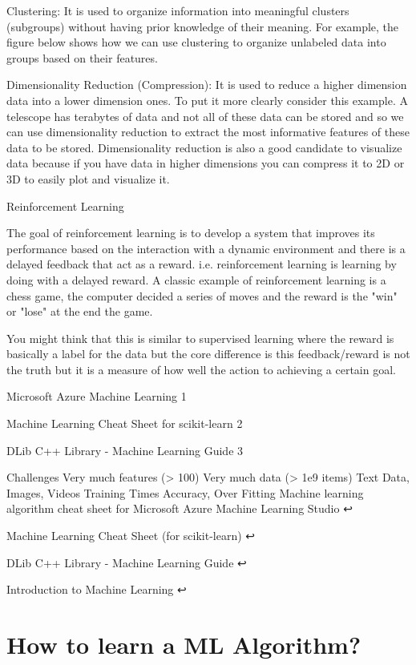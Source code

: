 Clustering: It is used to organize information into meaningful clusters (subgroups) without having prior knowledge of their meaning. For example, the figure below shows how we can use clustering to organize unlabeled data into groups based on their features.


Dimensionality Reduction (Compression): It is used to reduce a higher dimension data into a lower dimension ones. To put it more clearly consider this example. A telescope has terabytes of data and not all of these data can be stored and so we can use dimensionality reduction to extract the most informative features of these data to be stored. Dimensionality reduction is also a good candidate to visualize data because if you have data in higher dimensions you can compress it to 2D or 3D to easily plot and visualize it.

Reinforcement Learning

The goal of reinforcement learning is to develop a system that improves its performance based on the interaction with a dynamic environment and there is a delayed feedback that act as a reward. i.e. reinforcement learning is learning by doing with a delayed reward. A classic example of reinforcement learning is a chess game, the computer decided a series of moves and the reward is the "win" or "lose" at the end the game.

You might think that this is similar to supervised learning where the reward is basically a label for the data but the core difference is this feedback/reward is not the truth but it is a measure of how well the action to achieving a certain goal.

Microsoft Azure Machine Learning 1


Machine Learning Cheat Sheet for scikit-learn 2


DLib C++ Library - Machine Learning Guide 3


Challenges
Very much features (> 100)
Very much data (> 1e9 items)
Text Data, Images, Videos
Training Times
Accuracy, Over Fitting
Machine learning algorithm cheat sheet for Microsoft Azure Machine Learning Studio ↩

Machine Learning Cheat Sheet (for scikit-learn) ↩

DLib C++ Library - Machine Learning Guide ↩

Introduction to Machine Learning ↩

\section{How to learn a ML Algorithm?}

